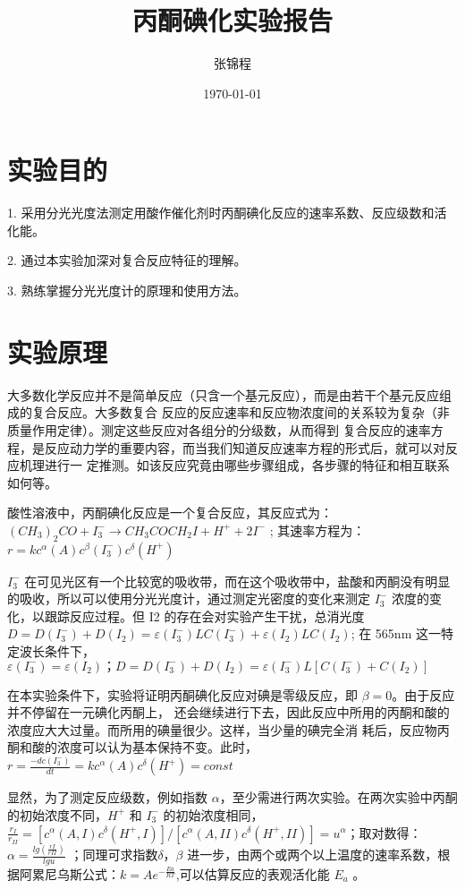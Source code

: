 \documentclass[4pt,a4papper]{article}
\title{\zihao{-2}\textbf{丙酮碘化实验报告}}
\author{张锦程}
\date{\today}
\begin{document}
\maketitle

\section{实验目的}
1. 采用分光光度法测定用酸作催化剂时丙酮碘化反应的速率系数、反应级数和活化能。 

2. 通过本实验加深对复合反应特征的理解。 

3. 熟练掌握分光光度计的原理和使用方法。

\section{实验原理}
	大多数化学反应并不是简单反应（只含一个基元反应），而是由若干个基元反应组成的复合反应。大多数复合 反应的反应速率和反应物浓度间的关系较为复杂（非质量作用定律）。测定这些反应对各组分的分级数，从而得到 复合反应的速率方程，是反应动力学的重要内容，而当我们知道反应速率方程的形式后，就可以对反应机理进行一 定推测。如该反应究竟由哪些步骤组成，各步骤的特征和相互联系如何等。

	酸性溶液中，丙酮碘化反应是一个复合反应，其反应式为：$(CH_3)_2CO + I_3^- → CH_3COCH_2I + H^+ + 2I^-$ ; 其速率方程为：$r = kc^\alpha(A)c^\beta(I_3^-)c^\delta(H^+)$ 

	$I_3^-$ 在可见光区有一个比较宽的吸收带，而在这个吸收带中，盐酸和丙酮没有明显的吸收，所以可以使用分光光度计，通过测定光密度的变化来测定 $I_3^-$ 浓度的变化，以跟踪反应过程。但 I2 的存在会对实验产生干扰，总消光度 $D = D(I_3^-) + D(I_2) = ε(I_3^-)LC(I_3^-) + ε(I_2)LC(I_2)$; 在 565nm 这一特定波长条件下， $ε(I_3^-) = ε(I_2)；D = D(I_3^-) + D(I_2) = ε(I_3^-)L[C(I_3^-) + C(I_2)]$ 

	在本实验条件下，实验将证明丙酮碘化反应对碘是零级反应，即 $β=0$。由于反应并不停留在一元碘化丙酮上， 还会继续进行下去，因此反应中所用的丙酮和酸的浓度应大大过量。而所用的碘量很少。这样，当少量的碘完全消 耗后，反应物丙酮和酸的浓度可以认为基本保持不变。此时， $r = \frac{-dc(I_3^-)}{dt} = kc^\alpha(A)c^\delta(H^+) = const$

	显然，为了测定反应级数，例如指数 $\alpha$，至少需进行两次实验。在两次实验中丙酮的初始浓度不同，$H^+$ 和 $I_3^-$ 的初始浓度相同， $\frac{r_I}{r_{II}} = [c^\alpha(A,I)c^\delta(H^+,I)]/[c^\alpha(A,II)c^\delta(H^+,II)] = u^\alpha$；取对数得：$\alpha= \frac{lg(\frac{rI}{rII})}{lgu}$ ；同理可求指数$\delta，\beta$ 进一步，由两个或两个以上温度的速率系数，根据阿累尼乌斯公式：$k = Ae^{-\frac{Ea}{RT}}$,可以估算反应的表观活化能 $E_a$ 。
\end{document}
